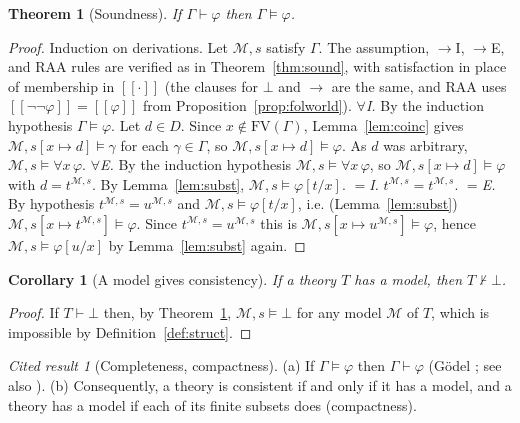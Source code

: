 \documentclass[11pt]{article}
\newcommand{\sem}[1]{[\![#1]\!]}
\theoremstyle{definition}
\theoremstyle{plain}
\newtheorem{theorem}[definition]{Theorem}
\newtheorem{corollary}[definition]{Corollary}
\theoremstyle{remark}
\newtheorem{cited}[definition]{Cited result}
\begin{document}
\begin{theorem}[Soundness]\label{thm:folsound}
If $\Gamma\vdash\varphi$ then $\Gamma\models\varphi$.
\end{theorem}
\begin{proof}
Induction on derivations. Let $\mathcal M,s$ satisfy $\Gamma$. The assumption, $\to$I, $\to$E, and RAA rules are verified as in Theorem~\ref{thm:sound}, with satisfaction in place of membership in $\sem\cdot$ (the clauses for $\bot$ and $\to$ are the same, and RAA uses $\sem{\neg\neg\varphi}=\sem\varphi$ from Proposition~\ref{prop:folworld}).
\emph{$\forall$I.} By the induction hypothesis $\Gamma\models\varphi$. Let $d\in D$. Since $x\notin\mathrm{FV}(\Gamma)$, Lemma~\ref{lem:coinc} gives $\mathcal M,s[x\mapsto d]\models\gamma$ for each $\gamma\in\Gamma$, so $\mathcal M,s[x\mapsto d]\models\varphi$. As $d$ was arbitrary, $\mathcal M,s\models\forall x\,\varphi$.
\emph{$\forall$E.} By the induction hypothesis $\mathcal M,s\models\forall x\,\varphi$, so $\mathcal M,s[x\mapsto d]\models\varphi$ with $d=t^{\mathcal M,s}$. By Lemma~\ref{lem:subst}, $\mathcal M,s\models\varphi[t/x]$.
\emph{$=$I.} $t^{\mathcal M,s}=t^{\mathcal M,s}$.
\emph{$=$E.} By hypothesis $t^{\mathcal M,s}=u^{\mathcal M,s}$ and $\mathcal M,s\models\varphi[t/x]$, i.e. (Lemma~\ref{lem:subst}) $\mathcal M,s[x\mapsto t^{\mathcal M,s}]\models\varphi$. Since $t^{\mathcal M,s}=u^{\mathcal M,s}$ this is $\mathcal M,s[x\mapsto u^{\mathcal M,s}]\models\varphi$, hence $\mathcal M,s\models\varphi[u/x]$ by Lemma~\ref{lem:subst} again.
\end{proof}

\begin{corollary}[A model gives consistency]\label{cor:model-cons}
If a theory $T$ has a model, then $T\nvdash\bot$.
\end{corollary}
\begin{proof}
If $T\vdash\bot$ then, by Theorem~\ref{thm:folsound}, $\mathcal M,s\models\bot$ for any model $\mathcal M$ of $T$, which is impossible by Definition~\ref{def:struct}.
\end{proof}

\begin{cited}[Completeness, compactness]\label{cit:godelcomplete}
(a) If $\Gamma\models\varphi$ then $\Gamma\vdash\varphi$ (G\"odel \cite{Goedel30}; see also \cite[Ch.~2]{Enderton01}). (b) Consequently, a theory is consistent if and only if it has a model, and a theory has a model if each of its finite subsets does (compactness).
\end{cited}
\end{document}
